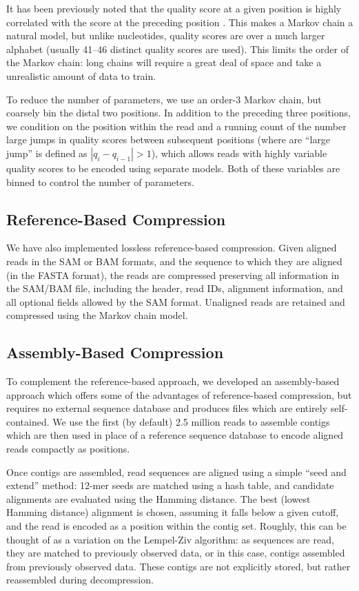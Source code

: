 \documentclass[twocolumn]{article}
\begin{document}
It has been previously noted that the quality score at a given position is
highly correlated with the score at the preceding position
\citep{Kozanitis2011}. This makes a Markov chain a natural model, but unlike
nucleotides, quality scores are over a much larger alphabet (usually 41--46
distinct quality scores are used). This limits the order of the Markov chain:
long chains will require a great deal of space and take a unrealistic amount
of data to train.

To reduce the number of parameters, we use an order-3 Markov chain, but
coarsely bin the distal two positions. In addition to the preceding three
positions, we condition on the position within the read and a running count of
the number large jumps in quality scores between subsequent positions (where
are ``large jump'' is defined as $|q_{i} - q_{i-1}| > 1$), which allows reads
with highly variable quality scores to be encoded using separate models. Both
of these variables are binned to control the number of parameters.


\subsection{Reference-Based Compression}

We have also implemented lossless reference-based compression. Given aligned
reads in the SAM or BAM formats, and the sequence to which they are aligned
(in the FASTA format), the reads are compressed preserving all information in
the SAM/BAM file, including the header, read IDs, alignment information, and
all optional fields allowed by the SAM format. Unaligned reads are retained
and compressed using the Markov chain model.


\subsection{Assembly-Based Compression}

To complement the reference-based approach, we developed an assembly-based
approach which offers some of the advantages of reference-based compression,
but requires no external sequence database and produces files which are
entirely self-contained. We use the first (by default) 2.5 million reads to
assemble contigs which are then used in place of a reference sequence
database to encode aligned reads compactly as positions.

Once contigs are assembled, read sequences are aligned using a simple ``seed
and extend'' method: 12-mer seeds are matched using a hash table, and
candidate alignments are evaluated using the Hamming distance. The best
(lowest Hamming distance) alignment is chosen, assuming it falls below a given
cutoff, and the read is encoded as a position within the contig set. Roughly,
this can be thought of as a variation on the Lempel-Ziv algorithm: as
sequences are read, they are matched to previously observed data, or in this
case, contigs assembled from previously observed data. These contigs are
not explicitly stored, but rather reassembled during decompression.
\end{document}
